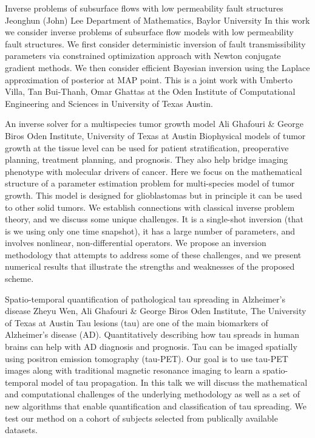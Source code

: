 \vspace{1.5ex}
\abs
{Inverse problems of subsurface flows with low permeability fault structures}
{Jeonghun (John) Lee}
{Department of Mathematics, Baylor University}
{In this work we consider inverse problems of subsurface flow models with low permeability fault structures. We first consider deterministic inversion of fault transmissibility parameters via constrained optimization approach with Newton conjugate gradient methods. We then consider efficient Bayesian inversion using the Laplace approximation of posterior at MAP point. This is a joint work with Umberto Villa, Tan Bui-Thanh, Omar Ghattas at the Oden Institute of Computational Engineering and Sciences in University of Texas Austin.}


\vspace{1.5ex}
\abs
{An inverse solver for a multispecies tumor growth model}
{Ali Ghafouri \& George Biros}
{Oden Institute, University of Texas at Austin}
{Biophysical models of tumor growth at the tissue level can be used for patient stratification, preoperative planning, treatment planning, and prognosis. They also help bridge imaging phenotype with molecular drivers of cancer. Here we focus on the mathematical structure of a parameter estimation problem for multi-species model of tumor growth. This model is designed for glioblastomas but in principle it can be used to other solid tumors.  We establish connections with classical inverse problem theory, and we discuss some unique challenges. It is a single-shot inversion (that is we using only one time snapshot), it has a large number of parameters, and involves nonlinear, non-differential operators. We propose an inversion methodology that attempts to address some of these challenges, and we present numerical results that illustrate the strengths and weaknesses of the proposed scheme.}


\vspace{1.5ex}
\abs
{Spatio-temporal quantification of pathological tau spreading in Alzheimer's disease}
{Zheyu Wen, Ali Ghafouri \& George Biros}
{Oden Institute, The University of Texas at Austin}
{Tau lesions (tau) are one of the main biomarkers of Alzheimer's disease (AD). Quantitatively describing how tau spreads in human brains can help with AD diagnosis and prognosis. Tau can be imaged spatially using positron emission tomography (tau-PET). Our goal is to use tau-PET images along with traditional magnetic resonance imaging to learn a spatio-temporal model of tau propagation. In this talk we will discuss the mathematical and computational challenges of the underlying methodology as well as a set of new algorithms that enable quantification and classification of tau spreading. We test our method on a cohort of subjects selected from publically available datasets.}


